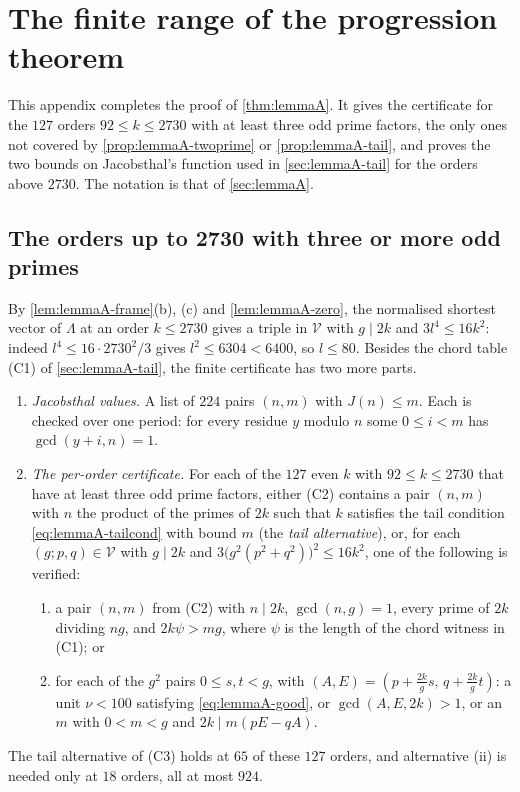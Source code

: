 \section{The finite range of the progression theorem}
\label{app:lemmaA-finite}

This appendix completes the proof of \autoref{thm:lemmaA}. It gives the
certificate for the $127$ orders $92\le k\le2730$ with at least three odd
prime factors, the only ones not covered by \autoref{prop:lemmaA-twoprime}
or \autoref{prop:lemmaA-tail}, and proves the two bounds on
Jacobsthal's function used in \autoref{sec:lemmaA-tail} for the orders above
$2730$. The notation is that of \autoref{sec:lemmaA}.

\subsection{The orders up to 2730 with three or more odd primes}

By \autoref{lem:lemmaA-frame}(b), (c) and \autoref{lem:lemmaA-zero}, the
normalised shortest vector of $\Lambda$ at an order $k\le2730$ gives a triple
in $\mathcal V$ with $g\mid2k$ and $3l^4\le16k^2$: indeed
$l^4\le16\cdot2730^2/3$ gives $l^2\le6304<6400$, so $l\le80$. Besides the chord table (C1) of
\autoref{sec:lemmaA-tail}, the finite certificate has two more parts.
\begin{enumerate}
\item[(C2)] \emph{Jacobsthal values.} A list of $224$ pairs $(n,m)$ with
$J(n)\le m$. Each is checked over one period: for every residue $y$ modulo
$n$ some $0\le i<m$ has $\gcd(y+i,n)=1$.
\item[(C3)] \emph{The per-order certificate.} For each of the $127$ even
$k$ with $92\le k\le2730$ that have at least three odd prime factors, either
(C2) contains a pair $(n,m)$ with $n$ the product of the primes of $2k$ such
that $k$ satisfies the tail condition \eqref{eq:lemmaA-tailcond} with bound
$m$ (the \emph{tail alternative}), or, for each $(g;p,q)\in\mathcal V$ with $g\mid2k$ and
$3\bigl(g^2(p^2+q^2)\bigr)^2\le16k^2$, one of the following is verified:
\begin{enumerate}
\item[(i)] a pair $(n,m)$ from (C2) with $n\mid2k$, $\gcd(n,g)=1$, every
prime of $2k$ dividing $ng$, and $2k\psi>mg$, where $\psi$ is the length
of the chord witness in (C1); or
\item[(ii)] for each of the $g^2$ pairs $0\le s,t<g$, with
$(A,E)=(p+\tfrac{2k}{g}s,\,q+\tfrac{2k}{g}t)$: a unit $\nu<100$
satisfying \eqref{eq:lemmaA-good}, or $\gcd(A,E,2k)>1$, or an
$m$ with $0<m<g$ and $2k\mid m(pE-qA)$.
\end{enumerate}
\end{enumerate}
The tail alternative of (C3) holds at $65$ of these $127$ orders, and
alternative (ii) is needed only at $18$ orders, all at most $924$.

